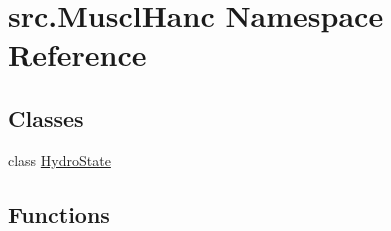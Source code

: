 \hypertarget{namespacesrc_1_1_muscl_hanc}{\section{src.\-Muscl\-Hanc Namespace Reference}
\label{namespacesrc_1_1_muscl_hanc}
}
\subsection*{Classes}
\begin{DoxyCompactItemize}
\item 
class \hyperlink{classsrc_1_1_muscl_hanc_1_1_hydro_state}{Hydro\-State}
\end{DoxyCompactItemize}
\subsection*{Functions}
